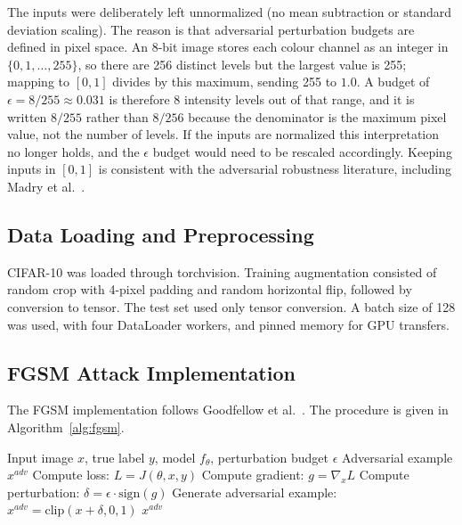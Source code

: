 The inputs were deliberately left unnormalized (no mean subtraction or standard deviation scaling). The reason is that adversarial perturbation budgets are defined in pixel space. An 8-bit image stores each colour channel as an integer in $\{0, 1, \dots, 255\}$, so there are 256 distinct levels but the largest value is 255; mapping to $[0, 1]$ divides by this maximum, sending 255 to $1.0$. A budget of $\epsilon = 8/255 \approx 0.031$ is therefore 8 intensity levels out of that range, and it is written $8/255$ rather than $8/256$ because the denominator is the maximum pixel value, not the number of levels. If the inputs are normalized this interpretation no longer holds, and the $\epsilon$ budget would need to be rescaled accordingly. Keeping inputs in $[0, 1]$ is consistent with the adversarial robustness literature, including Madry et al.~\cite{madry2018towards}.

\subsection{Data Loading and Preprocessing}

CIFAR-10 was loaded through torchvision. Training augmentation consisted of random crop with 4-pixel padding and random horizontal flip, followed by conversion to tensor. The test set used only tensor conversion. A batch size of 128 was used, with four DataLoader workers, and pinned memory for GPU transfers.

\subsection{FGSM Attack Implementation}

The FGSM implementation follows Goodfellow et al.~\cite{goodfellow2015explaining}. The procedure is given in Algorithm~\ref{alg:fgsm}.

\begin{algorithm}[htbp]
\caption{Fast Gradient Sign Method (FGSM)}
\label{alg:fgsm}
\begin{algorithmic}[1]
\REQUIRE Input image $x$, true label $y$, model $f_\theta$, perturbation budget $\epsilon$
\ENSURE Adversarial example $x^{adv}$
\STATE Compute loss: $L = J(\theta, x, y)$
\STATE Compute gradient: $g = \nabla_x L$
\STATE Compute perturbation: $\delta = \epsilon \cdot \text{sign}(g)$
\STATE Generate adversarial example: $x^{adv} = \text{clip}(x + \delta, 0, 1)$
\RETURN $x^{adv}$
\end{algorithmic}
\end{algorithm}

